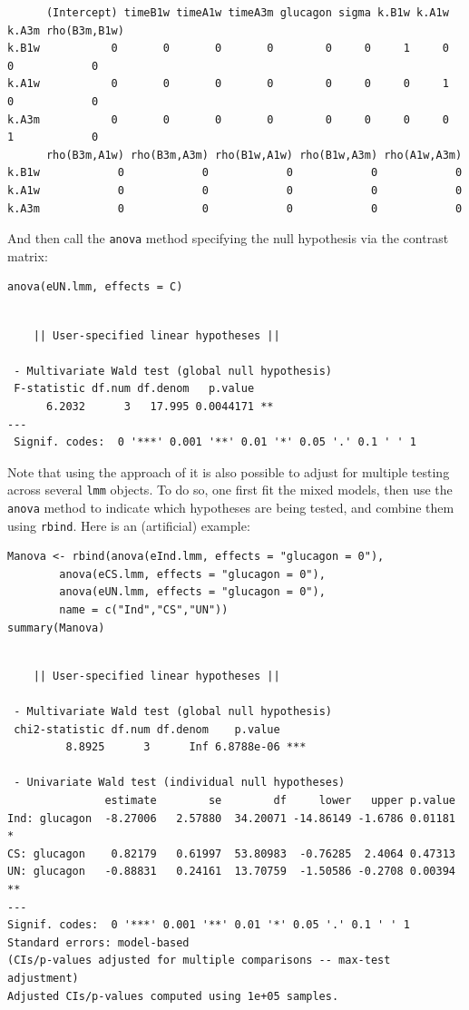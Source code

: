 \documentclass[12pt]{article}
\begin{document}
\begin{verbatim}
      (Intercept) timeB1w timeA1w timeA3m glucagon sigma k.B1w k.A1w k.A3m rho(B3m,B1w)
k.B1w           0       0       0       0        0     0     1     0     0            0
k.A1w           0       0       0       0        0     0     0     1     0            0
k.A3m           0       0       0       0        0     0     0     0     1            0
      rho(B3m,A1w) rho(B3m,A3m) rho(B1w,A1w) rho(B1w,A3m) rho(A1w,A3m)
k.B1w            0            0            0            0            0
k.A1w            0            0            0            0            0
k.A3m            0            0            0            0            0
\end{verbatim}


And then call the \texttt{anova} method specifying the null hypothesis via the
contrast matrix:
\lstset{language=r,label= ,caption= ,captionpos=b,numbers=none}
\begin{lstlisting}
anova(eUN.lmm, effects = C)
\end{lstlisting}

\begin{verbatim}

	|| User-specified linear hypotheses || 

 - Multivariate Wald test (global null hypothesis)
 F-statistic df.num df.denom   p.value   
      6.2032      3   17.995 0.0044171 **
---
 Signif. codes:  0 '***' 0.001 '**' 0.01 '*' 0.05 '.' 0.1 ' ' 1
\end{verbatim}


Note that using the approach of \cite{pipper2012versatile} it is also
possible to adjust for multiple testing across several \texttt{lmm}
objects. To do so, one first fit the mixed models, then use the
\texttt{anova} method to indicate which hypotheses are being tested, and
combine them using \texttt{rbind}. Here is an (artificial) example:
\lstset{language=r,label= ,caption= ,captionpos=b,numbers=none}
\begin{lstlisting}
Manova <- rbind(anova(eInd.lmm, effects = "glucagon = 0"),
		anova(eCS.lmm, effects = "glucagon = 0"),
		anova(eUN.lmm, effects = "glucagon = 0"),
		name = c("Ind","CS","UN"))
summary(Manova) 
\end{lstlisting}

\begin{verbatim}

	|| User-specified linear hypotheses || 

 - Multivariate Wald test (global null hypothesis)
 chi2-statistic df.num df.denom    p.value    
         8.8925      3      Inf 6.8788e-06 ***

 - Univariate Wald test (individual null hypotheses) 
               estimate        se        df     lower   upper p.value   
Ind: glucagon  -8.27006   2.57880  34.20071 -14.86149 -1.6786 0.01181 * 
CS: glucagon    0.82179   0.61997  53.80983  -0.76285  2.4064 0.47313   
UN: glucagon   -0.88831   0.24161  13.70759  -1.50586 -0.2708 0.00394 **
---
Signif. codes:  0 '***' 0.001 '**' 0.01 '*' 0.05 '.' 0.1 ' ' 1
Standard errors: model-based
(CIs/p-values adjusted for multiple comparisons -- max-test adjustment)
Adjusted CIs/p-values computed using 1e+05 samples.
\end{verbatim}
\end{document}
